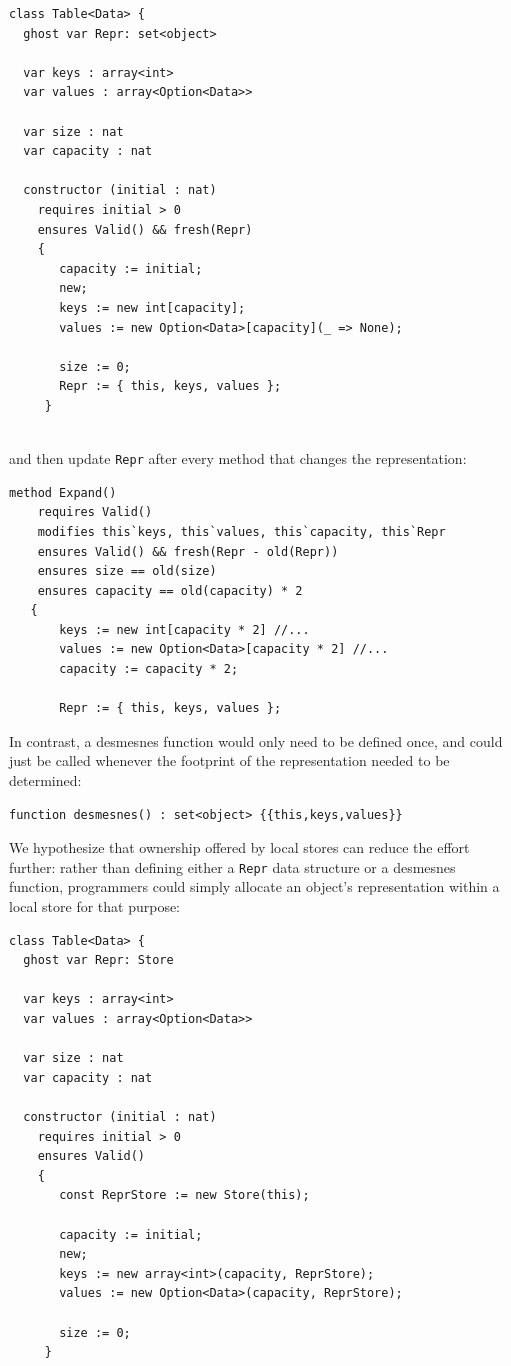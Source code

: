 \begin{lstlisting}
class Table<Data> {
  ghost var Repr: set<object>

  var keys : array<int>
  var values : array<Option<Data>>

  var size : nat
  var capacity : nat
    
  constructor (initial : nat)
    requires initial > 0
    ensures Valid() && fresh(Repr)
    {   
       capacity := initial;
       new;
       keys := new int[capacity];
       values := new Option<Data>[capacity](_ => None);

       size := 0;
       Repr := { this, keys, values };
     }
 
\end{lstlisting}


\noindent and then update \lstinline+Repr+
after every method that changes the representation:

\begin{lstlisting}
method Expand()
    requires Valid()
    modifies this`keys, this`values, this`capacity, this`Repr
    ensures Valid() && fresh(Repr - old(Repr))
    ensures size == old(size)
    ensures capacity == old(capacity) * 2
   {
       keys := new int[capacity * 2] //...
       values := new Option<Data>[capacity * 2] //...
       capacity := capacity * 2;

       Repr := { this, keys, values }; 
\end{lstlisting}


\noindent In contrast, a desmesnes function would only need to be
defined once, and could just be called whenever the footprint of the
representation needed to be determined:

\begin{lstlisting}
function desmesnes() : set<object> {{this,keys,values}} 
\end{lstlisting}


We hypothesize that ownership offered by local stores can reduce the
effort further: rather than defining either a \lstinline+Repr+ data
structure or a desmesnes function, programmers could simply allocate
an object's representation within a local store for that purpose:

\begin{lstlisting}
class Table<Data> {
  ghost var Repr: Store

  var keys : array<int>
  var values : array<Option<Data>>

  var size : nat
  var capacity : nat
    
  constructor (initial : nat)
    requires initial > 0
    ensures Valid()
    {  
       const ReprStore := new Store(this);
      
       capacity := initial;
       new;
       keys := new array<int>(capacity, ReprStore);
       values := new Option<Data>(capacity, ReprStore);

       size := 0;
     }
 
\end{lstlisting}


